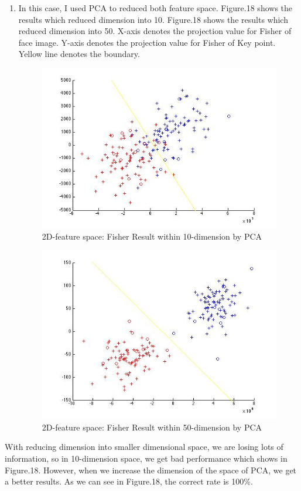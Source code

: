\documentclass[12pt]{ctexart}
\begin{document}
\begin{enumerate}
\item
In this case, I used PCA to reduced both feature space. Figure.18 shows the results which reduced dimension into 10. Figure.18 shows the results which reduced dimension into 50. X-axis denotes the projection value for Fisher of face image. Y-axis denotes the projection value for Fisher of Key point. Yellow line denotes the boundary.
\begin{figure}[H]
  \centering
  \includegraphics[scale=0.5]{b_fisher_pca10.jpg}
  \caption{2D-feature space: Fisher Result within 10-dimension by PCA}
\end{figure}
\begin{figure}[H]
  \centering
  \includegraphics[scale=0.5]{b_fisher_pca50.jpg}
  \caption{2D-feature space: Fisher Result within 50-dimension by PCA}
\end{figure}
\end{enumerate}
With reducing dimension into smaller dimensional space, we are losing lots of information, so in 10-dimension space, we get bad performance which shows in Figure.18. However, when we increase the dimension of the space of PCA, we get a better results. As we can see in Figure.18, the correct rate is 100\%.
\end{document}
